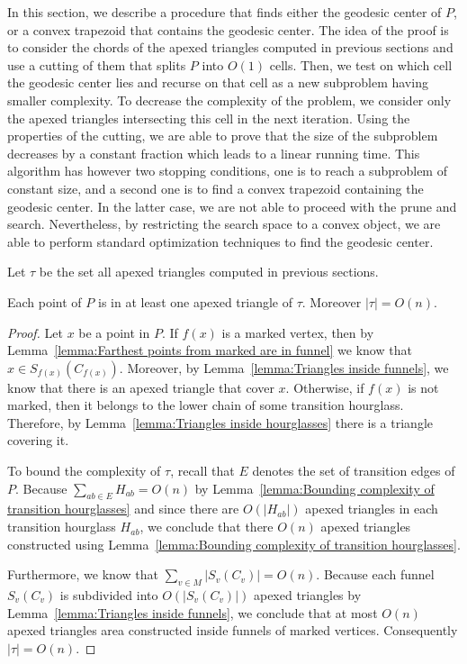 \documentclass[a4paper,UKenglish]{lipics}
\newcommand{\fn}[2]{\ensuremath{S_{\scriptscriptstyle #1}(#2)}}
\newcommand{\ff}[1]{\ensuremath{f(#1)}}
\begin{document}
In this section, we describe a procedure that finds either the geodesic center of $P$, or a convex trapezoid that contains the geodesic center.
The idea of the proof is to consider the chords of the apexed triangles computed in previous sections and use a cutting of them that splits $P$ into $O(1)$ cells. Then, we test on which cell the geodesic center lies and recurse on that cell as a new subproblem having smaller complexity. To decrease the complexity of the problem, we consider only the apexed triangles intersecting this cell in the next iteration. Using the properties of the cutting, we are able to prove that the size of the subproblem decreases by a constant fraction which leads to a linear running time. This algorithm has however two stopping conditions, one is to reach a subproblem of constant size, and a second one is to find a convex trapezoid containing the geodesic center. In the latter case, we are not able to proceed with the prune and search. Nevertheless, by restricting the search space to a convex object, we are able to perform standard optimization techniques to find the geodesic center.

Let $\tau$ be the set all apexed triangles computed in previous sections. 

\begin{lemma}\label{lemma:Size of tau}
Each point of $P$ is in at least one apexed triangle of $\tau$. Moreover $|\tau| = O(n)$.
\end{lemma}
\begin{proof}
Let $x$ be a point in $P$. If $\ff{x}$ is a marked vertex, then by Lemma~\ref{lemma:Farthest points from marked are in funnel} we know that $x\in \fn{\ff{x}}{C_{\ff{x}}}$. Moreover, by Lemma~\ref{lemma:Triangles inside funnels}, we know that there is an apexed triangle that cover $x$.
Otherwise, if $\ff{x}$ is not marked, then it belongs to the lower chain of some transition hourglass. 
Therefore, by Lemma~\ref{lemma:Triangles inside hourglasses} there is a triangle covering it.

To bound the complexity of $\tau$, recall that $E$ denotes the set of transition edges of $P$.
Because $\sum_{ab\in E} H_{ab} = O(n)$ by Lemma~\ref{lemma:Bounding complexity of transition hourglasses} and since there are $O(|H_{ab}|)$ apexed triangles in each transition hourglass $H_{ab}$, we conclude that there $O(n)$ apexed triangles constructed using Lemma~\ref{lemma:Bounding complexity of transition hourglasses}.

Furthermore, we know that $\sum_{v\in M} |\fn{v}{C_v}| = O(n)$. Because each funnel $\fn{v}{C_v}$ is subdivided into $O(|\fn{v}{C_v}|)$ apexed triangles by Lemma~\ref{lemma:Triangles inside funnels}, we conclude that at most $O(n)$ apexed triangles area constructed inside funnels of marked vertices. Consequently $|\tau| = O(n)$.
\end{proof}
\end{document}
